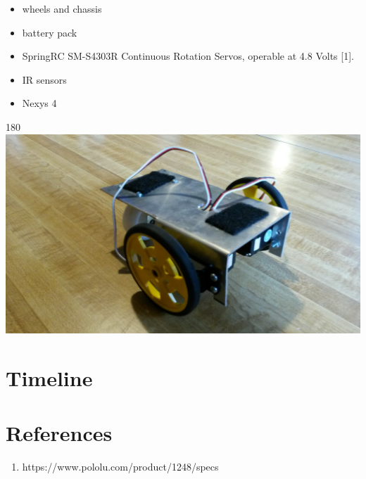 \documentclass{article}
\begin{document}
\begin{itemize}
  \item wheels and chassis
  \item battery pack
  \item SpringRC SM-S4303R Continuous Rotation Servos, operable at 4.8 Volts [1].
  \item IR sensors
  \item Nexys 4 
\end{itemize}
\begin{turn}{180} 
  \includegraphics[width=\textwidth]{chassis.jpg}
\end{turn}

\section*{Timeline}

\section*{References}
\begin{enumerate}
  \item https://www.pololu.com/product/1248/specs
\end{enumerate}
\end{document}
